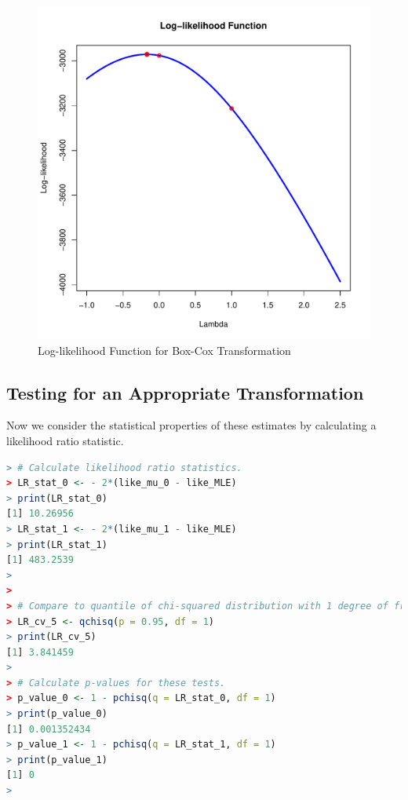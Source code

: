 \begin{figure}[h!]
  \centering
  \includegraphics[scale = 0.5, keepaspectratio=true]{../Figures/box_cox_loglike_uni}
  \caption{Log-likelihood Function for Box-Cox Transformation} \label{fig:box_cox_loglike_uni}
\end{figure}


\pagebreak
\subsection{Testing for an Appropriate Transformation}

Now we consider the statistical properties of these estimates
by calculating a likelihood ratio statistic.

\begin{lstlisting}[language=R]
> # Calculate likelihood ratio statistics.
> LR_stat_0 <- - 2*(like_mu_0 - like_MLE)
> print(LR_stat_0)
[1] 10.26956
> LR_stat_1 <- - 2*(like_mu_1 - like_MLE)
> print(LR_stat_1)
[1] 483.2539
> 
> 
> # Compare to quantile of chi-squared distribution with 1 degree of freedom.
> LR_cv_5 <- qchisq(p = 0.95, df = 1)
> print(LR_cv_5)
[1] 3.841459
> 
> # Calculate p-values for these tests.
> p_value_0 <- 1 - pchisq(q = LR_stat_0, df = 1)
> print(p_value_0)
[1] 0.001352434
> p_value_1 <- 1 - pchisq(q = LR_stat_1, df = 1)
> print(p_value_1)
[1] 0
> 
\end{lstlisting}


